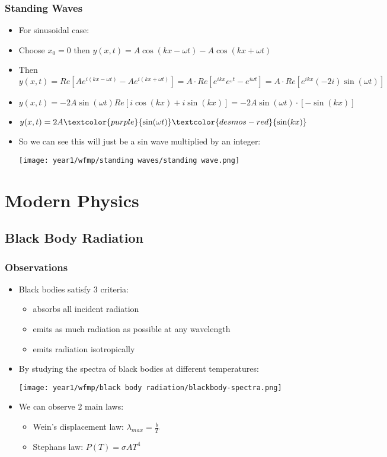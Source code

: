 \documentclass{article}
\begin{document}
\subsubsection*{Standing Waves}

\begin{itemize}
    \item For sinusoidal case:
    \item Choose \(x_0 = 0\) then \(y(x, t)=A\cos(kx-\omega t)-A\cos(kx+\omega t)\)
    \item Then \(y(x, t)=Re[Ae^{i(kx - \omega t)}-Ae^{i(kx+\omega t)}]=A\cdot Re[e^{ikx}{e^{_\omega t}-e^{i\omega t}}]=A\cdot Re[e^{ikx}(-2i)\sin(\omega t)]\)
    \item \(y(x, t)=-2A\sin(\omega t)Re[i{\cos(kx)+i\sin(kx)}]=-2A\sin(\omega t)\cdot [-\sin(kx)]\)
    \item \(y(x, t)=2A\textcolor{purple}{\sin(\omega t)} \textcolor{desmos-red}{\sin(kx)}\)
    \item So we can see this will just be a sin wave multiplied by an integer:
    
    \texttt{[image: year1/wfmp/standing waves/standing wave.png]}
\end{itemize}


\newpage
\section{Modern Physics}
\subsection{Black Body Radiation}

\subsubsection*{Observations}
\begin{itemize}
    \item Black bodies satisfy 3 criteria:
    \begin{itemize}
        \item absorbs all incident radiation
        \item emits as much radiation as possible at any wavelength
        \item emits radiation isotropically
    \end{itemize}
    \item By studying the spectra of black bodies at different temperatures:
    
    \texttt{[image: year1/wfmp/black body radiation/blackbody-spectra.png]}
    \item We can observe 2 main laws:
    \begin{itemize}
        \item Wein's displacement law: \(\lambda_{max} = \frac{b}{T}\)
        \item Stephans law: \(P(T) = \sigma AT^4\)
    \end{itemize}
\end{itemize}
\end{document}
